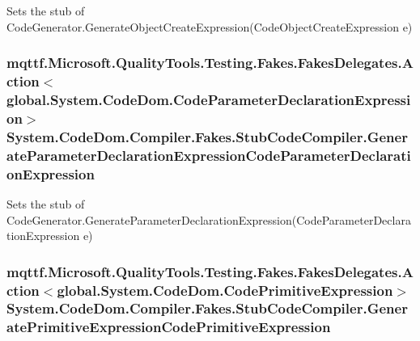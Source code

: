 Sets the stub of Code\-Generator.\-Generate\-Object\-Create\-Expression(\-Code\-Object\-Create\-Expression e)

\hypertarget{class_system_1_1_code_dom_1_1_compiler_1_1_fakes_1_1_stub_code_compiler_a6e47008e6a9aec75bc9d7f41b808050d}{
\subsubsection[{Generate\-Parameter\-Declaration\-Expression\-Code\-Parameter\-Declaration\-Expression}]{\setlength{\rightskip}{0pt plus 5cm}mqttf.\-Microsoft.\-Quality\-Tools.\-Testing.\-Fakes.\-Fakes\-Delegates.\-Action$<$global.\-System.\-Code\-Dom.\-Code\-Parameter\-Declaration\-Expression$>$ System.\-Code\-Dom.\-Compiler.\-Fakes.\-Stub\-Code\-Compiler.\-Generate\-Parameter\-Declaration\-Expression\-Code\-Parameter\-Declaration\-Expression}}\label{class_system_1_1_code_dom_1_1_compiler_1_1_fakes_1_1_stub_code_compiler_a6e47008e6a9aec75bc9d7f41b808050d}


Sets the stub of Code\-Generator.\-Generate\-Parameter\-Declaration\-Expression(\-Code\-Parameter\-Declaration\-Expression e)

\hypertarget{class_system_1_1_code_dom_1_1_compiler_1_1_fakes_1_1_stub_code_compiler_a93eb82a93698053ec2fd943976524130}{
\subsubsection[{Generate\-Primitive\-Expression\-Code\-Primitive\-Expression}]{\setlength{\rightskip}{0pt plus 5cm}mqttf.\-Microsoft.\-Quality\-Tools.\-Testing.\-Fakes.\-Fakes\-Delegates.\-Action$<$global.\-System.\-Code\-Dom.\-Code\-Primitive\-Expression$>$ System.\-Code\-Dom.\-Compiler.\-Fakes.\-Stub\-Code\-Compiler.\-Generate\-Primitive\-Expression\-Code\-Primitive\-Expression}}\label{class_system_1_1_code_dom_1_1_compiler_1_1_fakes_1_1_stub_code_compiler_a93eb82a93698053ec2fd943976524130}


